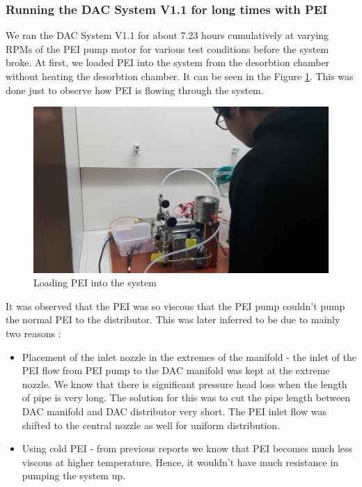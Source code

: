 \subsubsection{Running the DAC System V1.1 for long times with PEI}
\label{sec:obs}

We ran the DAC System V1.1 for about 7.23 hours cumulatively at varying RPMs of the PEI pump motor for various test conditions before the system broke. At first, we loaded PEI into the system from the desorbtion chamber without heating the desorbtion chamber. It can be seen in the Figure \ref{fig:peiloading}. This was done just to observe how PEI is flowing through the system. 

\begin{figure}[H]
    \centering
    \includegraphics[scale = 0.09]{images/mywork/Sprint3/peiloading1.jpg}
    \caption{Loading PEI into the system}
    \label{fig:peiloading}
\end{figure}

It was observed that the PEI was so viscous that the PEI pump couldn't pump the normal PEI to the distributor. This was later inferred to be due to mainly two reasons :
\begin{itemize}
    \item Placement of the inlet nozzle in the extremes of the manifold - the inlet of the PEI flow from PEI pump to the DAC manifold was kept at the extreme nozzle. We know that there is significant pressure head loss when the length of pipe is very long. The solution for this was to cut the pipe length between DAC manifold and DAC distributor very short. The PEI inlet flow was shifted to the central nozzle as well for uniform distribution. 
    \item Using cold PEI - from previous reports we know that PEI becomes much less viscous at higher temperature. Hence, it wouldn't have much resistance in pumping the system up. 
\end{itemize} 


